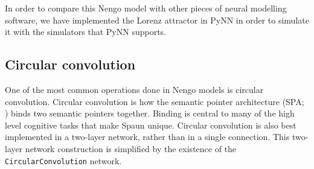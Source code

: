 \documentclass{frontiersSCNS}
\begin{document}
In order to compare this Nengo model
with other pieces of neural modelling software,
we have implemented the Lorenz attractor
in PyNN \cite{TODO} in order to simulate it
with the simulators that PyNN supports.

\subsection{Circular convolution}

One of the most common operations done
in Nengo models is circular convolution.
Circular convolution is how
the semantic pointer architecture
(SPA; \cite{TODO})
binds two semantic pointers together.
Binding is central to many
of the high level cognitive tasks
that make Spaun unique.
Circular convolution
is also best implemented in a two-layer network,
rather than in a single connection.
This two-layer network construction is simplified
by the existence of the \texttt{CircularConvolution} network.
\end{document}
